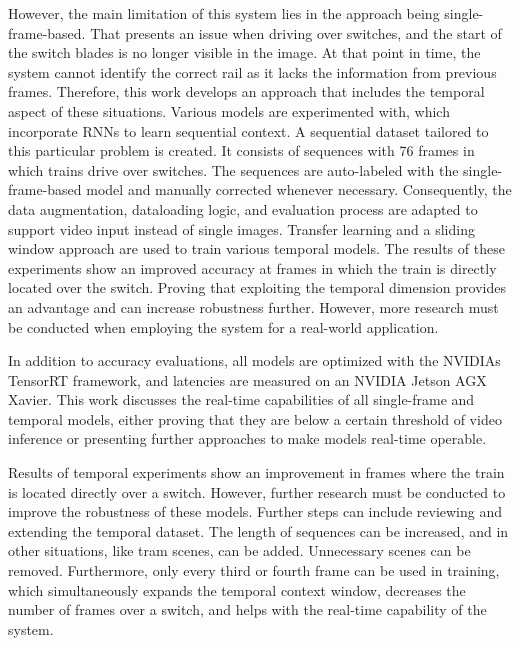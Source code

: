 However, the main limitation of this system lies in the approach being single-frame-based.
That presents an issue when driving over switches, and the start of the switch blades is no longer visible in the image.
At that point in time, the system cannot identify the correct rail as it lacks the information from previous frames.
Therefore, this work develops an approach that includes the temporal aspect of these situations.
Various models are experimented with, which incorporate \ac{RNN}s to learn sequential context.
A sequential dataset tailored to this particular problem is created.
It consists of sequences with 76 frames in which trains drive over switches.
The sequences are auto-labeled with the single-frame-based model and manually corrected whenever necessary.
Consequently, the data augmentation, dataloading logic, and evaluation process are adapted to support video input instead of single images.
Transfer learning and a sliding window approach are used to train various temporal models.
The results of these experiments show an improved accuracy at frames in which the train is directly located over the switch.
Proving that exploiting the temporal dimension provides an advantage and can increase robustness further.
However, more research must be conducted when employing the system for a real-world application.

In addition to accuracy evaluations, all models are optimized with the NVIDIAs TensorRT framework, and latencies are measured on an NVIDIA Jetson AGX Xavier.
This work discusses the real-time capabilities of all single-frame and temporal models, either proving that they are below a certain threshold of video inference or presenting further approaches to make models real-time operable.

\vspace{2cm}

\noindent Results of temporal experiments show an improvement in frames where the train is located directly over a switch.
However, further research must be conducted to improve the robustness of these models.
Further steps can include reviewing and extending the temporal dataset.
The length of sequences can be increased, and in other situations, like tram scenes, can be added.
Unnecessary scenes can be removed.
Furthermore, only every third or fourth frame can be used in training, which simultaneously expands the temporal context window, decreases the number of frames over a switch, and helps with the real-time capability of the system.

